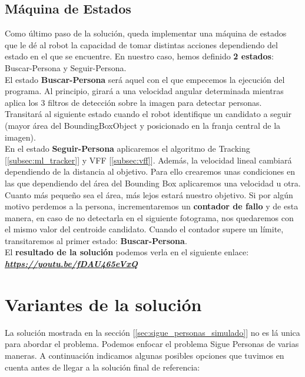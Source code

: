 \subsection{Máquina de Estados}
\label{subsec:maquina_estados}

Como último paso de la solución, queda implementar una máquina de estados que le dé al robot la capacidad de tomar distintas acciones dependiendo del estado en el que se encuentre. En nuestro caso, hemos definido \textbf{2 estados}: Buscar-Persona y Seguir-Persona.\\

El estado \textbf{Buscar-Persona} será aquel con el que empecemos la ejecución del programa. Al principio, girará a una velocidad angular determinada mientras aplica los 3 filtros de detección sobre la imagen para detectar personas. Transitará al siguiente estado cuando el robot identifique un candidato a seguir (mayor área del BoundingBoxObject y posicionado en la franja central de la imagen).\\

En el estado \textbf{Seguir-Persona} aplicaremos el algoritmo de Tracking [\ref{subsec:ml_tracker}] y VFF [\ref{subsec:vff}]. Además, la velocidad lineal cambiará dependiendo de la distancia al objetivo. Para ello crearemos unas condiciones en las que dependiendo del área del Bounding Box aplicaremos una velocidad u otra. Cuanto más pequeño sea el área, más lejos estará nuestro objetivo. Si por algún motivo perdemos a la persona, incrementaremos un \textbf{contador de fallo} y de esta manera, en caso de no detectarla en el siguiente fotograma, nos quedaremos con el mismo valor del centroide candidato. Cuando el contador supere un límite, transitaremos al primer estado: \textbf{Buscar-Persona}.\\

El \textbf{resultado de la solución} podemos verla en el siguiente enlace:\\ \textbf{\textit{\url{https://youtu.be/fDAU465eVxQ}}}\\



\section{Variantes de la solución}
\label{sec:variantes_solucion}

La solución mostrada en la sección [\ref{sec:sigue_personas_simulado}] no es lá unica para abordar el problema. Podemos enfocar el problema Sigue Personas de varias maneras. A continuación indicamos algunas posibles opciones que tuvimos en cuenta antes de llegar a la solución final de referencia:\\

